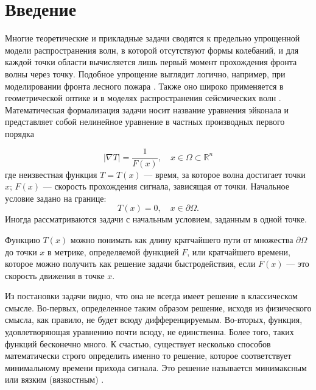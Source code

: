 \section*{Введение}
\label{intro}

Многие теоретические и прикладные задачи сводятся к предельно
упрощенной модели распространения волн, в которой отсутствуют формы
колебаний, и для каждой точки области вычисляется лишь первый момент
прохождения фронта волны через точку. Подобное упрощение выглядит
логично, например, при моделировании фронта лесного пожара
\cite{S1999}.  Также оно широко применяется в геометрической оптике и
в моделях распространения сейсмических волн \cite{I2005, N2015,B2006, W1969}.
Математическая формализация задачи носит название уравнения эйконала и
представляет собой нелинейное уравнение в частных производных первого
порядка

$$|\nabla T| = \frac{1}{F(x)}, \quad x \in \Omega \subset \mathbb{R}^n$$
где неизвестная функция $T=T(x)$ --- время, за которое волна достигает
точки $x$; $F(x)$ --- скорость прохождения сигнала, зависящая от
точки. Начальное условие задано на границе:
$$ T(x) = 0, \quad x \in \partial \Omega. $$
Иногда рассматриваются задачи с начальным условием, заданным в одной
точке.

Функцию $T(x)$ можно понимать как длину кратчайшего пути от множества
$\partial \Omega$ до точки $x$ в метрике, определяемой функцией $F$,
или кратчайшего времени, которое можно получить как решение задачи
быстродействия, если $F(x)$ --- это скорость движения в точке $x$.

Из постановки задачи видно, что она не всегда имеет решение в
классическом смысле. Во-первых, определенное таким образом решение,
исходя из физического смысла, как правило, не будет всюду
дифференцируемым. Во-вторых, функция, удовлетворяющая уравнению почти
всюду, не единственна. Более того, таких функций бесконечно много. К
счастью, существует несколько способов математически строго определить
именно то решение, которое соответствует минимальному времени прихода
сигнала. Это решение называется минимаксным или вязким (вязкостным)
\cite{V1983, V1984}. 


